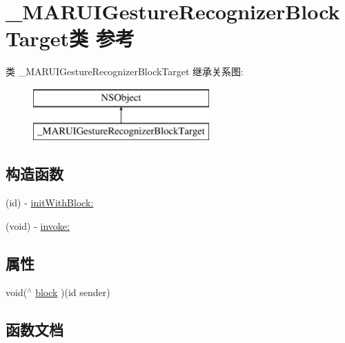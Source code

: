 \hypertarget{interface___m_a_r_u_i_gesture_recognizer_block_target}{}\section{\+\_\+\+M\+A\+R\+U\+I\+Gesture\+Recognizer\+Block\+Target类 参考}
\label{interface___m_a_r_u_i_gesture_recognizer_block_target}
类 \+\_\+\+M\+A\+R\+U\+I\+Gesture\+Recognizer\+Block\+Target 继承关系图\+:\begin{figure}[H]
\begin{center}
\leavevmode
\includegraphics[height=2.000000cm]{interface___m_a_r_u_i_gesture_recognizer_block_target}
\end{center}
\end{figure}
\subsection*{构造函数}
\begin{DoxyCompactItemize}
\item 
(id) -\/ \hyperlink{interface___m_a_r_u_i_gesture_recognizer_block_target_ac2c019c020f11fafc29b09e040498b68}{init\+With\+Block\+:}
\item 
(void) -\/ \hyperlink{interface___m_a_r_u_i_gesture_recognizer_block_target_a0ff92b2945d8c3722a4821b582455d27}{invoke\+:}
\end{DoxyCompactItemize}
\subsection*{属性}
\begin{DoxyCompactItemize}
\item 
void($^\wedge$ \hyperlink{interface___m_a_r_u_i_gesture_recognizer_block_target_a439fd3b5bc7af35f90a690300a495fcc}{block} )(id sender)
\end{DoxyCompactItemize}


\subsection{函数文档}
\mbox{\label{interface___m_a_r_u_i_gesture_recognizer_block_target_ac2c019c020f11fafc29b09e040498b68}} 
